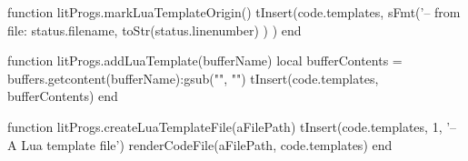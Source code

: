 
\startchapter[title=Lua Templates]

\startMkIVCode
{}
\setuptyping[Template][option=lua]

\let\oldStartLuaTemplate=\startLuaTemplate
\def\startLuaTemplate{%
  \directlua{thirddata.literateProgs.markLuaTemplateOrigin()}%
  \oldStartLuaTemplate%
}

\let\oldStopLuaTemplate=\stopLuaTemplate
\def\stopLuaTemplate{%
  \oldStopLuaTemplate%
  \directlua{thirddata.literateProgs.addLuaTemplate('_typing_')}}

\def\createTemplateFile[#1]{
  \directlua{thirddata.literateProgs.createLuaTemplateFile('#1')}
}
\stopMkIVCode

\startLuaCode
function litProgs.markLuaTemplateOrigin()
  tInsert(code.templates,
    sFmt('-- from file: %
      status.filename,
      toStr(status.linenumber)
    )
  )
end

function litProgs.addLuaTemplate(bufferName)
  local bufferContents = buffers.getcontent(bufferName):gsub("", "\n")
  tInsert(code.templates, bufferContents)
end

function litProgs.createLuaTemplateFile(aFilePath)
  tInsert(code.templates, 1, '-- A Lua template file')
  renderCodeFile(aFilePath, code.templates)
end
\stopLuaCode

\stopchapter